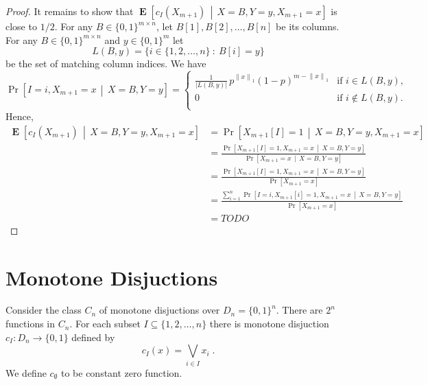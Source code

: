 \documentclass[10pt]{article}
\newcommand{\norm}[1]{\left\| #1 \right\|}
\DeclareMathOperator{\Exp}{\mathbf{E}}
\begin{document}
\begin{proof}
It remains to show that $\Exp\left[ c_I(X_{m+1}) \, \middle| \, X = B, Y = y, X_{m+1} = x \right]$ is close to $1/2$.
For any $B \in \{0,1\}^{m \times n}$, let $B[1], B[2], \dots, B[n]$ be its columns.
For any $B \in \{0,1\}^{m \times n}$ and $y \in \{0,1\}^m$ let
$$
L(B,y) = \{ i \in \{1,2,\dots,n\} ~:~ B[i] = y \}
$$
be the set of matching column indices. We have
$$
\Pr \left[ I = i, X_{m+1} = x \, \middle| \, X = B, Y = y \right]
=
\begin{cases}
\frac{1}{|L(B,y)|} \, p^{\norm{x}_1} (1 - p)^{m-\norm{x}_1} & \text{if $i \in L(B,y)$,} \\
0 & \text{if $i \not \in L(B,y)$.} \\
\end{cases}
$$
Hence,
\begin{align*}
\Exp\left[ c_I(X_{m+1}) \, \middle| \, X = B, Y = y, X_{m+1} = x \right]
& = \Pr \left[ X_{m+1}[I] = 1 \, \middle| \, X = B, Y = y, X_{m+1} = x \right] \\
& = \frac{\Pr \left[ X_{m+1}[I] = 1, X_{m+1} = x \, \middle| \, X = B, Y = y \right]}{\Pr \left[ X_{m+1} = x \, \middle| \, X = B, Y = y \right]} \\
& = \frac{\Pr \left[ X_{m+1}[I] = 1, X_{m+1} = x \, \middle| \, X = B, Y = y \right]}{\Pr \left[ X_{m+1} = x \right]} \\
& = \frac{\sum_{i=1}^n \Pr \left[ I = i, X_{m+1}[i] = 1, X_{m+1} = x \, \middle| \, X = B, Y = y \right]}{\Pr \left[ X_{m+1} = x \right]} \\
& = TODO
\end{align*}
\end{proof}


\section{Monotone Disjuctions}

Consider the class $C_n$ of monotone disjuctions over $D_n = \{0,1\}^n$.
There are $2^n$ functions in $C_n$. For each subset $I \subseteq \{1,2,\dots,n\}$
there is monotone disjuction $c_I:D_n \to \{0,1\}$ defined by
$$
c_I(x) = \bigvee_{i \in I} x_i \; .
$$
We define $c_\emptyset$ to be constant zero function.
\end{document}
